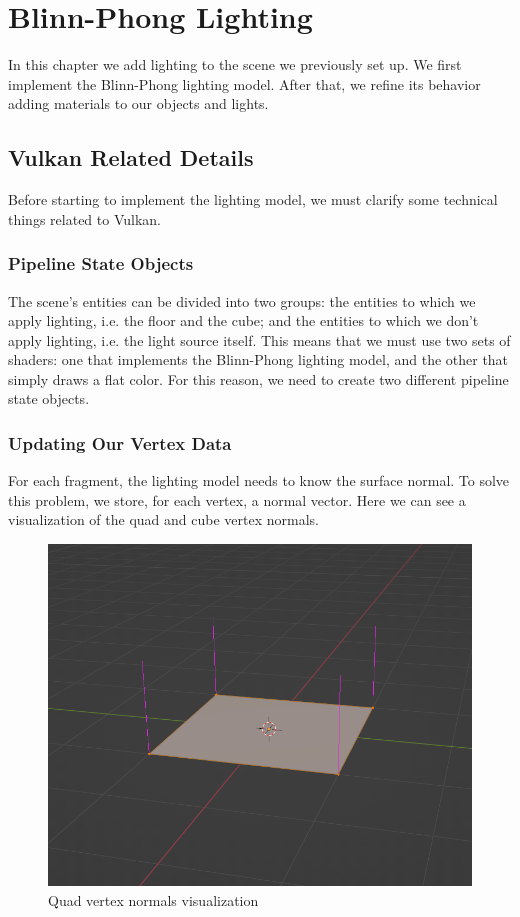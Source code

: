 \chapter{Blinn-Phong Lighting}
\label{chap:BlinnPhong}

In this chapter we add lighting to the scene we previously set up.
We first implement the Blinn-Phong lighting model.
After that, we refine its behavior adding materials to our objects and lights.

\section{Vulkan Related Details}

Before starting to implement the lighting model, we must clarify some technical
things related to Vulkan.

\subsection{Pipeline State Objects}

The scene's entities can be divided into two groups: the entities to which we
apply lighting, i.e. the floor and the cube; and the entities to which we
don't apply lighting, i.e. the light source itself.
This means that we must use two sets of shaders: one that implements
the Blinn-Phong lighting model, and the other that simply draws a flat color.
For this reason, we need to create two different pipeline state objects.

\subsection{Updating Our Vertex Data}

For each fragment, the lighting model needs to know the surface normal.
To solve this problem, we store, for each vertex, a normal vector.
Here we can see a visualization of the quad and cube vertex normals.

\begin{figure}[H]
    \centering
    \includegraphics[scale=0.40]{images/ChBlinnPhong/QuadVertexNormals.png}
    \caption{Quad vertex normals visualization}
    \label{fig::QuadVertexNormals}
\end{figure}

